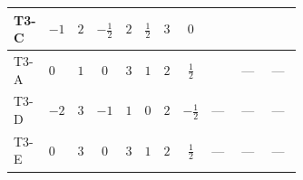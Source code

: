 \documentclass[8pt]{article}
\begin{document}
\begin{landscape}
\begin{longtable}{@{}llcccccc >{\raggedright\arraybackslash}p{0.21\linewidth} >{\raggedright\arraybackslash}p{0.21\linewidth} >{\raggedright\arraybackslash}p{0.21\linewidth}@{}}
\midrule
T3-C & $-1$ & $2$ & $-\frac{1}{2}$ & $2$ & $\frac{1}{2}$ & $3$ & $0$ & \scriptsize\adjustbox{max width=\linewidth}{$\begin{gathered} {\lambda_{H1}} (6 \operatorname{Tr}\!\left({Y_d}\,\left({Y_d}\right)^{\dagger}\right)+2 \operatorname{Tr}\!\left({Y_e}\,\left({Y_e}\right)^{\dagger}\right)+6 \operatorname{Tr}\!\left({Y_u}\,\left({Y_u}\right)^{\dagger}\right))\end{gathered}$} & \scriptsize\adjustbox{max width=\linewidth}{$\begin{gathered} +24 {\lambda_{H^\dagger H^\dagger S_1^\dagger S_1^\dagger}} \left({\lambda_{H^\dagger H^\dagger S_1^\dagger S_1^\dagger}}\right)^{*}\end{gathered}$} & \scriptsize\adjustbox{max width=\linewidth}{$\begin{gathered} +3 {\lambda_{S_1 S_1^{\dagger 2}S_2^\dagger}} \left({\lambda_{H H^\dagger S_1^\dagger S_2^\dagger}^{\rm Cross}}\right)^{*}\end{gathered}$} \\
\midrule
T3-A & $0$ & $1$ & $0$ & $3$ & $1$ & $2$ & $\frac{1}{2}$ & \scriptsize\adjustbox{max width=\linewidth}{$\begin{gathered} {\lambda_{H1}} (6 \operatorname{Tr}\!\left({Y_d}\,\left({Y_d}\right)^{\dagger}\right)+2 \operatorname{Tr}\!\left({Y_e}\,\left({Y_e}\right)^{\dagger}\right)+6 \operatorname{Tr}\!\left({Y_u}\,\left({Y_u}\right)^{\dagger}\right))\end{gathered}$} & --- & --- \\
\midrule
T3-D & $-2$ & $3$ & $-1$ & $1$ & $0$ & $2$ & $-\frac{1}{2}$ & --- & --- & --- \\
\midrule
T3-E & $0$ & $3$ & $0$ & $3$ & $1$ & $2$ & $\frac{1}{2}$ & --- & --- & --- \\
\midrule
\bottomrule
\end{longtable}
\clearpage

\end{landscape}
\end{document}
